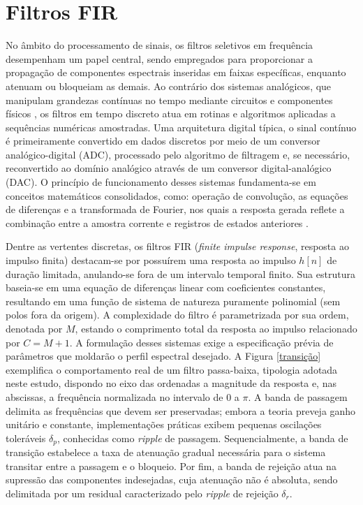 \section{Filtros FIR}
No âmbito do processamento de sinais, os filtros seletivos em frequência desempenham um papel central, sendo empregados para proporcionar a propagação de componentes espectrais inseridas em faixas específicas, enquanto atenuam ou bloqueiam as demais. Ao contrário dos sistemas analógicos, que manipulam grandezas contínuas no tempo mediante circuitos e componentes físicos \cite{sedra2000microeletrônica}, os filtros em tempo discreto atua em rotinas e algoritmos aplicadas a sequências numéricas amostradas. Uma arquitetura digital típica, o sinal contínuo é primeiramente convertido em dados discretos por meio de um conversor analógico-digital (ADC), processado pelo algoritmo de filtragem e, se necessário, reconvertido ao domínio analógico através de um conversor digital-analógico (DAC). O princípio de funcionamento desses sistemas fundamenta-se em conceitos matemáticos consolidados, como: operação de convolução, as equações de diferenças e a transformada de Fourier, nos quais a resposta gerada reflete a combinação entre a amostra corrente e registros de estados anteriores \cite{oppenheim2013processamento}.

Dentre as vertentes discretas, os filtros FIR (\textit{finite impulse response}, resposta ao impulso finita) destacam-se por possuírem uma resposta ao impulso $h[n]$ de duração limitada, anulando-se fora de um intervalo temporal finito. Sua estrutura baseia-se em uma equação de diferenças linear com coeficientes constantes, resultando em uma função de sistema de natureza puramente polinomial (sem polos fora da origem). A complexidade do filtro é parametrizada por sua ordem, denotada por $M$, estando o comprimento total da resposta ao impulso relacionado por $C = M + 1$. A formulação desses sistemas exige a especificação prévia de parâmetros que moldarão o perfil espectral desejado. A Figura \ref{transição} exemplifica o comportamento real de um filtro passa-baixa, tipologia adotada neste estudo, dispondo no eixo das ordenadas a magnitude da resposta e, nas abscissas, a frequência normalizada no intervalo de $0$ a $\pi$. A banda de passagem delimita as frequências que devem ser preservadas; embora a teoria preveja ganho unitário e constante, implementações práticas exibem pequenas oscilações toleráveis $\delta_p$, conhecidas como \textit{ripple} de passagem. Sequencialmente, a banda de transição estabelece a taxa de atenuação gradual necessária para o sistema transitar entre a passagem e o bloqueio. Por fim, a banda de rejeição atua na supressão das componentes indesejadas, cuja atenuação não é absoluta, sendo delimitada por um residual caracterizado pelo \textit{ripple} de rejeição $\delta_r$.

